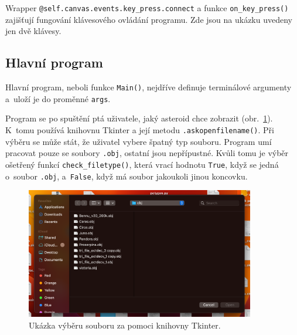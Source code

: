 \documentclass[11pt]{article}
\begin{document}


Wrapper \verb|@self.canvas.events.key_press.connect| a funkce \verb|on_key_press()| zajišťují fungování klávesového ovládání programu. Zde jsou na ukázku uvedeny jen dvě klávesy.




\subsection{Hlavní program}

Hlavní program, neboli funkce \verb|Main()|, nejdříve definuje terminálové argumenty a~uloží je do proměnné \verb|args|.



Program se po spuštění ptá uživatele, jaký asteroid chce zobrazit (obr.~\ref{tkinter}). K~tomu používá knihovnu Tkinter a její metodu \verb|.askopenfilename()|. Při výběru se může stát, že uživatel vybere špatný typ souboru. Program umí pracovat pouze se soubory \verb|.obj|, ostatní jsou nepřípustné. Kvůli tomu je výběr ošetřený funkcí \verb|check_filetype()|, která vrací hodnotu \verb|True|, když se jedná o~soubor \verb|.obj|, a~\verb|False|, když má soubor jakoukoli jinou koncovku.



\begin{figure}[h]
\includegraphics[width=10cm]{figs/tkinter.png}
\centering
\caption{Ukázka výběru souboru za pomoci knihovny Tkinter.}
\label{tkinter}
\end{figure}
\end{document}

